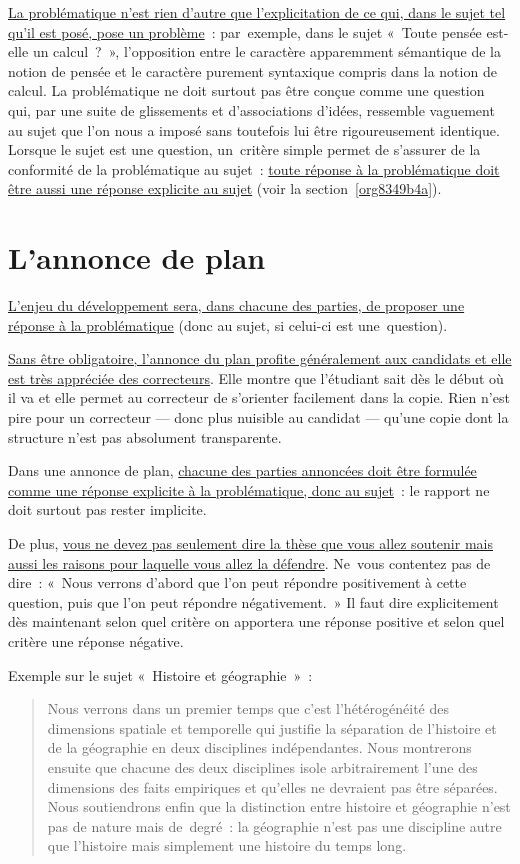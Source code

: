 \documentclass[a4paper,12pt]{report}
\begin{document}
\uline{La problématique n'est rien d'autre que l'explicitation de ce qui, dans
le sujet tel qu'il est posé, pose un problème} : par exemple, dans le
sujet « Toute pensée est-elle un calcul ? », l'opposition entre le
caractère apparemment sémantique de la notion de pensée et le caractère
purement syntaxique compris dans la notion de calcul. La problématique
ne doit surtout pas être conçue comme une question qui, par une suite de
glissements et d'associations d'idées, ressemble vaguement au sujet que
l'on nous a imposé sans toutefois lui être rigoureusement identique.
Lorsque le sujet est une question, un critère simple permet de s'assurer
de la conformité de la problématique au sujet : \uline{toute réponse à la
problématique doit être aussi une réponse explicite au sujet} (voir la
section \ref{org8349b4a}).



\section{L'annonce de plan}
\label{sec:orgd3590c6}
\label{org93201f4}

\uline{L'enjeu du développement sera, dans chacune des parties, de proposer
une réponse à la problématique} (donc au sujet, si celui-ci est
une question).

\uline{Sans être obligatoire, l'annonce du plan profite généralement aux
candidats et elle est très appréciée des correcteurs}. Elle montre que
l'étudiant sait dès le début où il va et elle permet au correcteur de
s'orienter facilement dans la copie. Rien n'est pire pour un correcteur
— donc plus nuisible au candidat — qu'une copie dont la structure n'est
pas absolument transparente.

Dans une annonce de plan, \uline{chacune des parties annoncées doit être
formulée comme une réponse explicite à la problématique, donc au
sujet} : le rapport ne doit surtout pas rester implicite.

De plus, \uline{vous ne devez pas seulement dire la thèse que vous allez
soutenir mais aussi les raisons pour laquelle vous allez la défendre}.
Ne vous contentez pas de dire : « Nous verrons d'abord que l'on peut
répondre positivement à cette question, puis que l'on peut répondre
négativement. » Il faut dire explicitement dès maintenant selon quel
critère on apportera une réponse positive et selon quel critère une
réponse négative.

Exemple sur le sujet « Histoire et géographie » :
\begin{quotation}
Nous verrons dans un premier temps que c'est l'hétérogénéité des
dimensions spatiale et temporelle qui justifie la séparation de
l'histoire et de la géographie en deux disciplines indépendantes. Nous
montrerons ensuite que chacune des deux disciplines isole arbitrairement
l'une des dimensions des faits empiriques et qu'elles ne devraient pas
être séparées. Nous soutiendrons enfin que la distinction entre histoire
et géographie n'est pas de nature mais de degré : la géographie n'est
pas une discipline autre que l'histoire mais simplement une histoire du
temps long.
\end{quotation}
\end{document}
